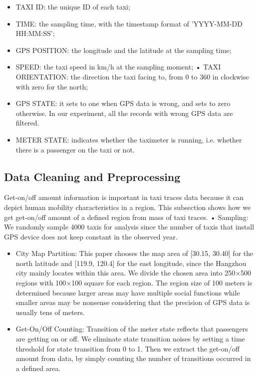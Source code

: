 \documentclass[a4paper, 10pt, conference]{ieeeconf}      %
\begin{document}
\begin{itemize}

\item TAXI ID: the unique ID of each taxi;
\item TIME: the sampling time, with the timestamp format of ’YYYY-MM-DD HH:MM:SS’;
\item GPS POSITION: the longitude and the latitude at the sampling time;
\item SPEED: the taxi speed in km/h at the sampling moment; • TAXI ORIENTATION: the direction the taxi facing to, from 0 to 360 in clockwise with zero for the north;
\item GPS STATE: it sets to one when GPS data is wrong, and sets to zero otherwise. In our experiment, all the records with wrong GPS data are filtered.
\item METER STATE: indicates whether the taximeter is running, i.e. whether there is a passenger on the taxi or not.

\end{itemize}

\subsection{Data Cleaning and Preprocessing}Get-on/off amount information is important in taxi traces data because it can depict human mobility characteristics in a region. This subsection shows how we get get-on/off amount of a defined region from mass of taxi traces. • Sampling: We randomly sample 4000 taxis for analysis since the number of taxis that install GPS device does not keep constant in the observed year.

\begin{itemize}

\item City Map Partition: This paper chooses the map area of [30.15, 30.40] for the north latitude and [119.9, 120.4] for the east longitude, since the Hangzhou city mainly locates within this area. We divide the chosen area into 250×500 regions with 100×100 square for each region. The region size of 100 meters is determined because larger areas may have multiple social functions while smaller areas may be nonsense considering that the precision of GPS data is usually tens of meters.
\item Get-On/Off Counting: Transition of the meter state reflects that passengers are getting on or off. We eliminate state transition noises by setting a time threshold for state transition from 0 to 1. Then we extract the get-on/off amount from data, by simply counting the number of transitions occurred in a defined area.

\end{itemize}
\end{document}
